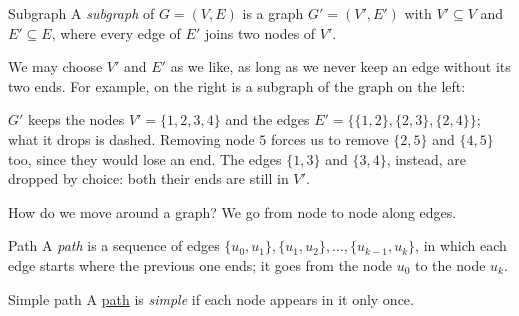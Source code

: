 \documentclass[a4paper,12pt,oneside]{report}
\begin{document}
\begin{frameddefn}{Subgraph}\label{def:subgraph}
A \emph{subgraph} of $G=(V,E)$ is a graph $G'=(V',E')$ with
$V'\subseteq V$ and $E'\subseteq E$, where every edge of $E'$ joins
two nodes of $V'$.
\end{frameddefn}

We may choose $V'$ and $E'$ as we like, as long as we never keep an
edge without its two ends. For example, on the right is a subgraph of
the graph on the left:
\begin{center}
\end{center}
$G'$ keeps the nodes $V'=\{1,2,3,4\}$ and the edges
$E'=\{\{1,2\},\{2,3\},\{2,4\}\}$; what it drops is dashed. Removing
node $5$ forces us to remove $\{2,5\}$ and $\{4,5\}$ too, since they
would lose an end. The edges $\{1,3\}$ and $\{3,4\}$, instead, are
dropped by choice: both their ends are still in $V'$.

How do we move around a graph? We go from
node to node along edges.

\begin{frameddefn}{Path}\label{def:path}
A \emph{path} is a sequence of edges
$\{u_0,u_1\},\{u_1,u_2\},\ldots,\{u_{k-1},u_k\}$, in which each edge
starts where the previous one ends; it goes from the node $u_0$ to the
node $u_k$.
\end{frameddefn}

\begin{frameddefn}{Simple path}\label{def:simple-path}
A \hyperref[def:path]{path} is \emph{simple} if each node appears in
it only once.
\end{frameddefn}
\end{document}
